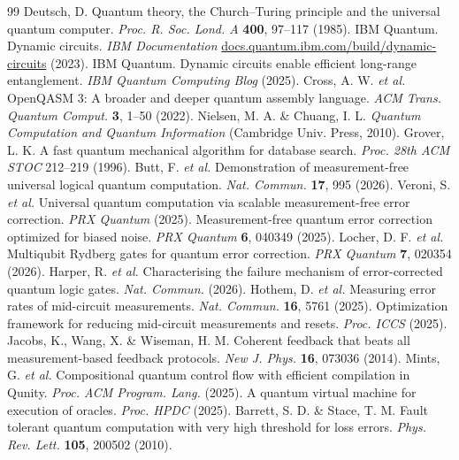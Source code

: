 \documentclass[11pt]{article}
\begin{document}
\begin{thebibliography}{99}
 Deutsch, D. Quantum theory, the Church--Turing principle and the universal quantum computer. \textit{Proc. R. Soc. Lond. A} \textbf{400}, 97--117 (1985).
 IBM Quantum. Dynamic circuits. \textit{IBM Documentation} \href{https://docs.quantum.ibm.com/build/dynamic-circuits}{docs.quantum.ibm.com/build/dynamic-circuits} (2023).
 IBM Quantum. Dynamic circuits enable efficient long-range entanglement. \textit{IBM Quantum Computing Blog} (2025).
 Cross, A. W. \textit{et al.} OpenQASM 3: A broader and deeper quantum assembly language. \textit{ACM Trans. Quantum Comput.} \textbf{3}, 1--50 (2022).
 Nielsen, M. A. \& Chuang, I. L. \textit{Quantum Computation and Quantum Information} (Cambridge Univ. Press, 2010).
 Grover, L. K. A fast quantum mechanical algorithm for database search. \textit{Proc. 28th ACM STOC} 212--219 (1996).
 Butt, F. \textit{et al.} Demonstration of measurement-free universal logical quantum computation. \textit{Nat. Commun.} \textbf{17}, 995 (2026).
 Veroni, S. \textit{et al.} Universal quantum computation via scalable measurement-free error correction. \textit{PRX Quantum} (2025).
 Measurement-free quantum error correction optimized for biased noise. \textit{PRX Quantum} \textbf{6}, 040349 (2025).
 Locher, D. F. \textit{et al.} Multiqubit Rydberg gates for quantum error correction. \textit{PRX Quantum} \textbf{7}, 020354 (2026).
 Harper, R. \textit{et al.} Characterising the failure mechanism of error-corrected quantum logic gates. \textit{Nat. Commun.} (2026).
 Hothem, D. \textit{et al.} Measuring error rates of mid-circuit measurements. \textit{Nat. Commun.} \textbf{16}, 5761 (2025).
 Optimization framework for reducing mid-circuit measurements and resets. \textit{Proc. ICCS} (2025).
 Jacobs, K., Wang, X. \& Wiseman, H. M. Coherent feedback that beats all measurement-based feedback protocols. \textit{New J. Phys.} \textbf{16}, 073036 (2014).
 Mints, G. \textit{et al.} Compositional quantum control flow with efficient compilation in Qunity. \textit{Proc. ACM Program. Lang.} (2025).
 A quantum virtual machine for execution of oracles. \textit{Proc. HPDC} (2025).
 Barrett, S. D. \& Stace, T. M. Fault tolerant quantum computation with very high threshold for loss errors. \textit{Phys. Rev. Lett.} \textbf{105}, 200502 (2010).

\end{thebibliography}
\end{document}
